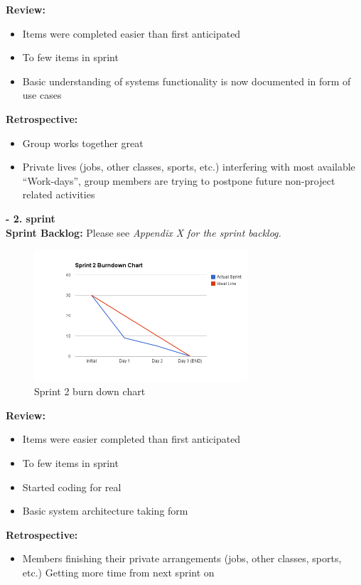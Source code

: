 \documentclass[11pt]{article}
\begin{document}
\textbf{Review:}
\begin{itemize}
\item Items were completed easier than first anticipated
\item To few items in sprint
\item Basic understanding of systems functionality is now documented in form of use cases
\end{itemize}
\textbf{Retrospective:}
\begin{itemize}
\item Group works together great
\item Private lives (jobs, other classes, sports, etc.) interfering with most available
         ``Work-days'', group members are trying to postpone future non-project related activities
\end{itemize}

\textbf{- 2. sprint} \\

\textbf{Sprint Backlog:} Please see \emph{Appendix X for the sprint backlog.}

\begin{figure}[H]
  		\centering
    	\includegraphics[width=300px]{images/SCRUM/Sprint 2 burndown chart.png}
    	\caption{Sprint 2 burn down chart}
\end{figure}

     \textbf{Review:}
\begin{itemize}
\item Items were easier completed than first anticipated
\item To few items in sprint
\item Started coding for real
\item Basic system architecture taking form
\end{itemize}
     \textbf{Retrospective:}
\begin{itemize}
\item Members finishing their private arrangements (jobs, other classes, sports, etc.)
       Getting more time from next sprint on
\end{itemize}
\end{document}
